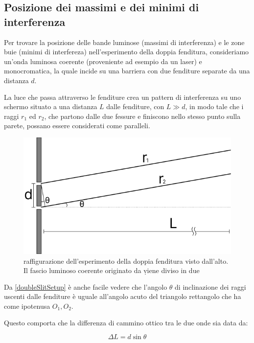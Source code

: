 \documentclass[12pt,a4paper]{report}
\begin{document}
\subsection{Posizione dei massimi e dei minimi di interferenza}

Per trovare la posizione delle bande luminose (massimi di interferenza) e le zone buie (minimi di interfereza) nell'esperimento della doppia fenditura, consideriamo un'onda luminosa coerente (proveniente ad esempio da un laser) e monocromatica, la quale incide su una barriera con due fenditure separate da una distanza \(d\). 

La luce che passa attraverso le fenditure crea un pattern di interferenza su uno schermo situato a una distanza \(L\) dalle fenditure, con \(L \gg d \), in modo tale che i raggi \(r_1\) ed \(r_2\), che partono dalle due fessure e finiscono nello stesso punto sulla parete, possano essere considerati come paralleli.

\begin{figure}[!ht]
    \centering
    \includegraphics[width=\linewidth]{Immagini/double_slit_setup.png}
    \captionsetup{width=.8\linewidth}
    \caption{raffigurazione dell'esperimento della doppia fenditura visto dall'alto. Il fascio luminoso coerente originato da \d viene diviso in due }
    \label{fig:doubleSlitSetup}
\end{figure}

Da \cref{doubleSlitSetup} è anche facile vedere che l'angolo \(\theta\) di inclinazione dei raggi uscenti dalle fenditure è uguale all'angolo acuto del triangolo rettangolo che ha come ipotenusa \(O_1, O_2 \).

Questo comporta che la differenza di cammino ottico tra le due onde sia data da:

\[ \Delta L = d \sin \theta \]
\end{document}
